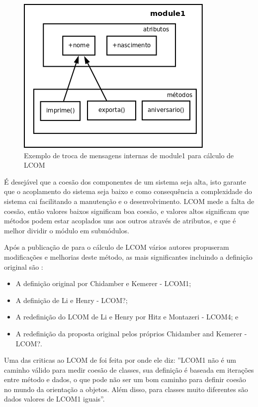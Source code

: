 \begin{figure}[h]
\center
\includegraphics[scale=0.4]{imagens/exemplo-lcom}
\caption{Exemplo de troca de mensagens internas de module1 para cálculo de LCOM}
\label{fig:exemplo-lcom}
\end{figure}

É desejável que a coesão dos componentes de um sistema seja alta, isto garante
que o acoplamento do sistema seja baixo e como consequência a complexidade do
sistema cai facilitando a manutenção e o desenvolvimento. LCOM mede a falta de
coesão, então valores baixos significam boa coesão, e valores altos significam
que métodos podem estar acoplados uns aos outros através de atributos, e que é
melhor dividir o módulo em submódulos\cite{observationsOnLCOM}.

Após a publicação de  para o cálculo de LCOM vários
autores propuseram modificações e melhorias deste método, as mais significantes
incluindo a definição original são \cite{principalComponentAnalysisOfLCOM}:

\begin{itemize}
\item A definição original por Chidamber e Kemerer - LCOM1;
\item A definição de Li e Henry - LCOM?;
\item A redefinição do LCOM de Li e Henry por Hitz e Montazeri - LCOM4; e
\item A redefinição da proposta original pelos próprios Chidamber and Kemerer - LCOM?.
\end{itemize}

Uma das criticas ao LCOM de  foi feita por
 onde ele diz: ''LCOM1 não é um caminho válido
para medir coesão de classes, sua definição é baseada em iterações entre método
e dados, o que pode não ser um bom caminho para definir coesão no mundo da
orientação a objetos. Além disso, para classes muito diferentes são dados
valores de LCOM1 iguais''.

